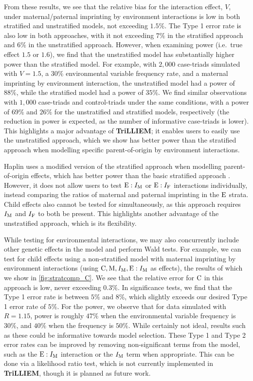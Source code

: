 From these results, we see that the relative bias for the interaction effect, $V$, under maternal/paternal imprinting by environment interactions is low in both stratified and unstratified models, not exceeding $1.5\%$.
The Type 1 error rate is also low in both approaches, with it not exceeding $7\%$ in the stratified approach and $6\%$ in the unstratified approach.
However, when examining power (i.e.\ true effect $1.5$ or $1.6$), we find that the unstratified model has substantially higher power than the stratified model.
For example, with $2,000$ case-triads simulated with $V = 1.5$, a $30\%$ environmental variable frequency rate, and a maternal imprinting by environment interaction, the unstratified model had a power of $88\%$, while the stratified model had a power of $35\%$.
We find similar observations with $1,000$ case-triads and control-triads under the same conditions, with a power of $69\%$ and $26\%$ for the unstratified and stratified models, respectively (the reduction in power is expected, as the number of informative case-triads is lower).
This highlights a major advantage of \textbf{TriLLIEM}; it enables users to easily use the unstratified approach, which we show has better power than the stratified approach when modelling specific parent-of-origin by environment interactions.

Haplin uses a modified version of the stratified approach when modelling parent-of-origin effects, which has better power than the basic stratified approach \cite{Gjer+18}.
However, it does not allow users to test ${\rm E}:I_{{\rm M}}$ or ${\rm E}:I_{{\rm F}}$ interactions individually, instead comparing the ratios of maternal and paternal imprinting in the ${\rm E}$ strata.
Child effects also cannot be tested for simultaneously, as this approach requires $I_{{\rm M}}$ and $I_{{\rm F}}$ to both be present.
This highlights another advantage of the unstratified approach, which is its flexibility.

While testing for environmental interactions, we may also concurrently include other genetic effects in the model and perform Wald tests.
For example, we can test for child effects using a non-stratified model with maternal imprinting by environment interactions (using ${\rm C}, {\rm M}, I_{{\rm M}}, {\rm E}:I_{{\rm M}}$ as effects), the results of which we show in \cref{fig:stratcomp_C}.
We see that the relative error for ${\rm C}$ in this approach is low, never exceeding $0.3\%$.
In significance tests, we find that the Type 1 error rate is between $5\%$ and $8\%$, which slightly exceeds our desired Type 1 error rate of $5\%$.
For the power, we observe that for data simulated with $R = 1.15$, power is roughly $47\%$ when the environmental variable frequency is $30\%$, and $40\%$ when the frequency is $50\%$.
While certainly not ideal, results such as these could be informative towards model selection.
These Type 1 and Type 2 error rates can be improved by removing non-significant terms from the model, such as the ${\rm E}:I_{{\rm M}}$ interaction or the $I_{{\rm M}}$ term when appropriate.
This can be done via a likelihood ratio test, which is not currently implemented in \textbf{TriLLIEM}, though it is planned as future work.

